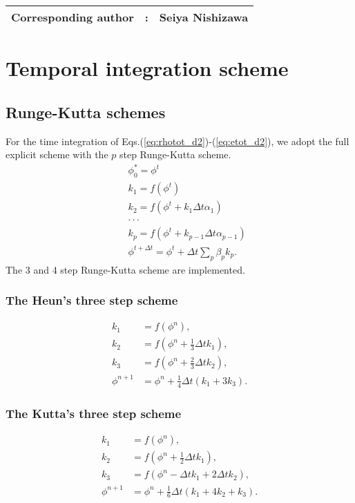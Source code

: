 {\bf \Large
\begin{tabular}{ccc}
\hline
  Corresponding author & : & Seiya Nishizawa\\
\hline
\end{tabular}
}

\section{Temporal integration scheme}

\subsection{Runge-Kutta schemes}

For the time integration of Eqs.(\ref{eq:rhotot_d2})-(\ref{eq:etot_d2}),
we adopt the full explicit scheme with
the $p$ step Runge-Kutta scheme.
\begin{eqnarray}
&& \phi^{*}_{0} = \phi^{t}\\
&& k_1 = f(\phi^t) \\
&& k_2 = f(\phi^t + k_1 \Delta t \alpha_1) \\
&&  \cdot \cdot \cdot\nonumber\\
&& k_p = f(\phi^t + k_{p-1} \Delta t \alpha_{p-1}) \\
&& \phi^{t+\Delta t} = \phi^t + \Delta t\sum_p \beta_p k_p. \label{eq:rkscheme_last_stage}
\end{eqnarray}
The 3 and 4 step Runge-Kutta scheme are implemented.


\subsubsection{The Heun's three step scheme}

\begin{align}
  k_1 &= f(\phi^n), \\
  k_2 &= f\left(\phi^n + \frac{1}{3}\Delta t k_1\right), \\
  k_3 &= f\left(\phi^n + \frac{2}{3}\Delta t k_2\right), \\
  \phi^{n+1} &= \phi^n + \frac{1}{4}\Delta t (k_1 + 3k_3).
\end{align}


\subsubsection{The Kutta's three step scheme}

\begin{align}
  k_1 &= f(\phi^n), \\
  k_2 &= f\left(\phi^n + \frac{1}{2}\Delta t k_1\right), \\
  k_3 &= f\left(\phi^n - \Delta t k_1  + 2 \Delta t k_2\right), \\
  \phi^{n+1} &= \phi^n + \frac{1}{6}\Delta t (k_1 + 4k_2 + k_3).
\end{align}


